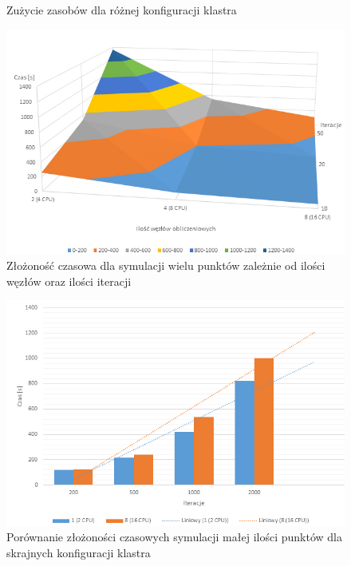 \documentclass[a4paper,onecolumn,oneside,12pt]{memoir}
\begin{document}
{{\begin{figure}[h!]
	\caption{Zużycie zasobów dla różnej konfiguracji klastra}
	\label{fig:stronaTytulowa}
\end{figure}
\begin{figure}[h!]
	\centering
	\includegraphics[width=1\linewidth]{wykres-1}
	\caption{Złożoność czasowa dla symulacji wielu punktów zależnie od ilości węzłów oraz ilości iteracji}
	\label{fig:stronaTytulowa}
\end{figure}

\begin{figure}[h!]
	\centering
	\includegraphics[width=1\linewidth]{wykres-2}
	\caption{Porównanie złożoności czasowych symulacji małej ilości punktów dla skrajnych konfiguracji klastra}
	\label{fig:stronaTytulowa}
\end{figure}


}}
\end{document}
